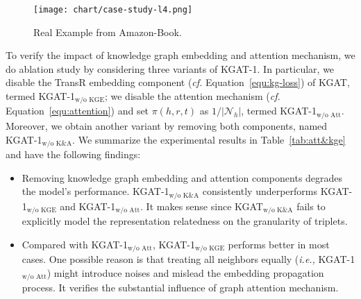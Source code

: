 \documentclass[sigconf]{acmart}
\newcommand{\Set}[1]{\mathcal{#1}}
\newcommand{\ie}{\emph{i.e., }}
\newcommand{\cf}{\emph{cf. }}
\theoremstyle{definition}
\begin{document}
\begin{table}[t]
\caption{Effect of knowledge graph embedding and attention mechanism.
}
\vspace{-10px}
\label{tab:att&kge}
\vspace{-10px}
\end{table}

\begin{figure}[t]
    \centering
	\texttt{[image: chart/case-study-l4.png]}
	\vspace{-10pt}
	\caption{Real Example from Amazon-Book.}
	\label{fig:case-study}
	\vspace{-15pt}
\end{figure}

To verify the impact of knowledge graph embedding and attention mechanism, we do ablation study by considering three variants of KGAT-1.
In particular, we disable the TransR embedding component (\cf Equation~\eqref{equ:kg-loss}) of KGAT, termed KGAT-1$_{\text{w/o KGE}}$;
we disable the attention mechanism (\cf Equation~\eqref{equ:attention}) and set $\pi(h,r,t)$ as $1/|\Set{N}_{h}|$, termed KGAT-1$_{\text{w/o Att}}$.
Moreover, we obtain another variant by removing both components, named KGAT-1$_{\text{w/o K\&A}}$.
We summarize the experimental results in Table~\ref{tab:att&kge} and have the following findings:
\begin{itemize}[leftmargin=*]
    \item Removing knowledge graph embedding and attention components degrades the model's performance. KGAT-1$_{\text{w/o K\&A}}$ consistently underperforms KGAT-1$_{\text{w/o KGE}}$ and KGAT-1$_{\text{w/o Att}}$.
    It makes sense since KGAT$_{\text{w/o K\&A}}$ fails to explicitly model the representation relatedness on the granularity of triplets.
    
    
    \item Compared with KGAT-1$_{\text{w/o Att}}$, KGAT-1$_{\text{w/o KGE}}$ performs better in most cases. One possible reason is that treating all neighbors equally (\ie KGAT-1$_{\text{w/o Att}}$) might introduce noises and mislead the embedding propagation process. 
    It verifies the substantial influence of graph attention mechanism.
\end{itemize}
\end{document}
